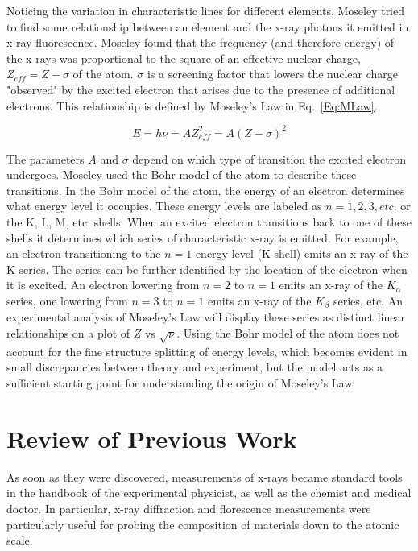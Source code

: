 \documentclass[%
 reprint,
 amsmath,amssymb,
 aps,
 pra,
]{revtex4-1}
\begin{document}
Noticing the variation in characteristic lines for different elements, Moseley tried to find some relationship between an element and the x-ray photons it emitted in x-ray fluorescence. Moseley found that the frequency (and therefore energy) of the x-rays was proportional to the square of an effective nuclear charge, $Z_{eff} = Z - \sigma$ of the atom. $\sigma$ is a screening factor that lowers the nuclear charge "observed" by the excited electron that arises due to the presence of additional electrons\cite{moseley}. This relationship is defined by Moseley's Law in Eq.~\ref{Eq:MLaw}. 

\begin{equation}\label{Eq:MLaw}
E = h\nu = A Z_{eff}^{2} = A (Z - \sigma)^2
\end{equation}

The parameters $A$ and $\sigma$ depend on which type of transition the excited electron undergoes. Moseley used the Bohr model of the atom to describe these transitions. In the Bohr model of the atom, the energy of an electron determines what energy level it occupies. These energy levels are labeled as $n = 1, 2, 3, etc.$ or the K, L, M, etc. shells. When an excited electron transitions back to one of these shells it determines which series of characteristic x-ray is emitted. For example, an electron transitioning to the $n = 1$ energy level (K shell) emits an x-ray of the K series. The series can be further identified by the location of the electron when it is excited. An electron lowering from $n = 2$ to $n = 1$ emits an x-ray of the $K_{\alpha}$ series, one lowering from $n = 3$ to $n = 1$ emits an x-ray of the $K_{\beta}$ series, etc. An experimental analysis of Moseley's Law will display these series as distinct linear relationships on a plot of $Z$ vs $\sqrt{\nu}$. Using the Bohr model of the atom does not account for the fine structure splitting of energy levels, which becomes evident in small discrepancies between theory and experiment, but the model acts as a sufficient starting point for understanding the origin of Moseley's Law.

\section{Review of Previous Work}

As soon as they were discovered, measurements of x-rays became standard tools in the handbook of the experimental physicist, as well as the chemist and medical doctor. In particular, x-ray diffraction and florescence measurements were particularly useful for probing the composition of materials down to the atomic scale. 
\end{document}
